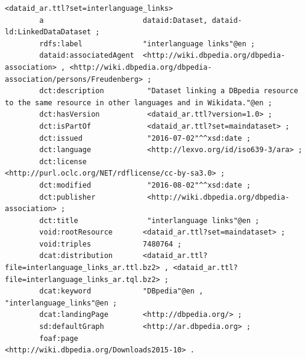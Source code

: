 \documentclass[a4paper,english,twoside,BCOR1.5cm,headsepline,DIV12,appendixprefix,final,12pt]{scrbook}
\begin{document}
\begin{lstlisting}[language=ttl, captionpos=b, label=lst:dcex,linewidth=\columnwidth,breaklines=true,basicstyle=\ttfamily\scriptsize]
<dataid_ar.ttl?set=interlanguage_links>
        a                       dataid:Dataset, dataid-ld:LinkedDataDataset ;
        rdfs:label              "interlanguage links"@en ;
        dataid:associatedAgent  <http://wiki.dbpedia.org/dbpedia-association> , <http://wiki.dbpedia.org/dbpedia-association/persons/Freudenberg> ;
        dct:description          "Dataset linking a DBpedia resource to the same resource in other languages and in Wikidata."@en ;
        dct:hasVersion           <dataid_ar.ttl?version=1.0> ;
        dct:isPartOf             <dataid_ar.ttl?set=maindataset> ;
        dct:issued               "2016-07-02"^^xsd:date ;
        dct:language             <http://lexvo.org/id/iso639-3/ara> ;
        dct:license              <http://purl.oclc.org/NET/rdflicense/cc-by-sa3.0> ;
        dct:modified             "2016-08-02"^^xsd:date ;
        dct:publisher            <http://wiki.dbpedia.org/dbpedia-association> ;
        dct:title                "interlanguage links"@en ;
        void:rootResource       <dataid_ar.ttl?set=maindataset> ;
        void:triples            7480764 ;
        dcat:distribution       <dataid_ar.ttl?file=interlanguage_links_ar.ttl.bz2> , <dataid_ar.ttl?file=interlanguage_links_ar.tql.bz2> ;
        dcat:keyword            "DBpedia"@en , "interlanguage_links"@en ;
        dcat:landingPage        <http://dbpedia.org/> ;
        sd:defaultGraph         <http://ar.dbpedia.org> ;
        foaf:page               <http://wiki.dbpedia.org/Downloads2015-10> .
        

\end{lstlisting}
\end{document}
